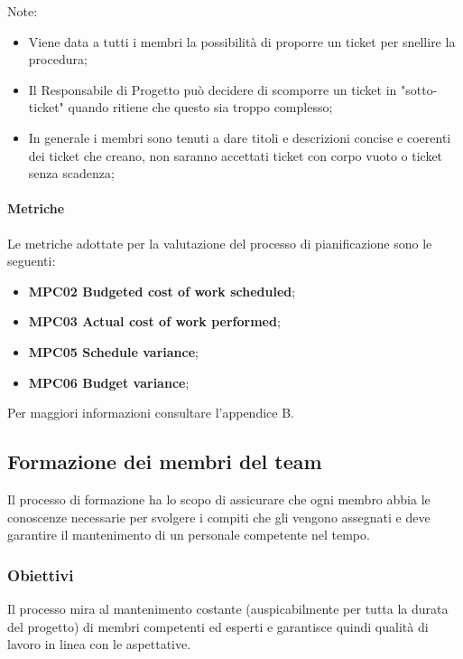 Note:
\begin{itemize}
\item Viene data a tutti i membri la possibilità di proporre un ticket per snellire la procedura;
\item Il Responsabile di Progetto può decidere di scomporre un ticket in "sotto-ticket" quando ritiene che questo sia troppo complesso;
\item In generale i membri sono tenuti a dare titoli e descrizioni concise e coerenti dei ticket che creano, non saranno accettati ticket con corpo vuoto o ticket senza scadenza;
\end{itemize}

\paragraph{Metriche}
Le metriche adottate per la valutazione del processo di pianificazione sono le seguenti:
\begin{itemize}
\item \textbf{MPC02 Budgeted cost of work scheduled};
\item \textbf{MPC03 Actual cost of work performed};
\item \textbf{MPC05 Schedule variance};
\item \textbf{MPC06 Budget variance};
\end{itemize} 
Per maggiori informazioni consultare l'appendice B.


\subsection{Formazione dei membri del team}
Il processo di formazione ha lo scopo di assicurare che ogni membro abbia le conoscenze necessarie per svolgere i compiti che gli vengono assegnati e deve garantire il mantenimento di un personale competente nel tempo.

\subsubsection{Obiettivi}
Il processo mira al mantenimento costante (auspicabilmente per tutta la durata del progetto) di membri competenti ed esperti e garantisce quindi qualità di lavoro in linea con le aspettative.

